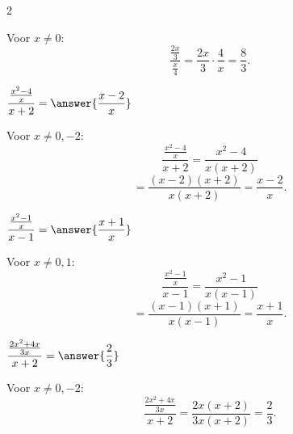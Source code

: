 \documentclass{ximera}
\begin{document}
\begin{oefening}{\oefB}
\begin{multicols}{2}
\begin{question}
            \begin{oplossing}
            Voor $x\neq0$:
            \[
            \dfrac{\frac{2x}{3}}{\frac{x}{4}}
            =\dfrac{2x}{3}\cdot\dfrac4x
            =\dfrac83.
            \]
            \end{oplossing}
            \end{question}
            
            
            \begin{question}
            $\dfrac{\frac{x^2-4}{x}}{x+2}
            =\answer{\dfrac{x-2}{x}}$
            
            \begin{oplossing}
            Voor $x\neq0,-2$:
            \[
            \dfrac{\frac{x^2-4}{x}}{x+2}
            =\dfrac{x^2-4}{x(x+2)}
            \]
            \[
            =\dfrac{(x-2)(x+2)}{x(x+2)}
            =\dfrac{x-2}{x}.
            \]
            \end{oplossing}
            \end{question}
            
            
            \begin{question}
            $\dfrac{\frac{x^2-1}{x}}{x-1}
            =\answer{\dfrac{x+1}{x}}$
            
            \begin{oplossing}
            Voor $x\neq0,1$:
            \[
            \dfrac{\frac{x^2-1}{x}}{x-1}
            =\dfrac{x^2-1}{x(x-1)}
            \]
            \[
            =\dfrac{(x-1)(x+1)}{x(x-1)}
            =\dfrac{x+1}{x}.
            \]
            \end{oplossing}
            \end{question}
            
            
            \begin{question}
            $\dfrac{\frac{2x^2+4x}{3x}}{x+2}
            =\answer{\dfrac23}$
            
            \begin{oplossing}
            Voor $x\neq0,-2$:
            \[
            \dfrac{\frac{2x^2+4x}{3x}}{x+2}
            =\dfrac{2x(x+2)}{3x(x+2)}
            =\dfrac23.
            \]
            \end{oplossing}
            \end{question}
            
            \end{multicols}
            
            \end{oefening}
\end{document}
